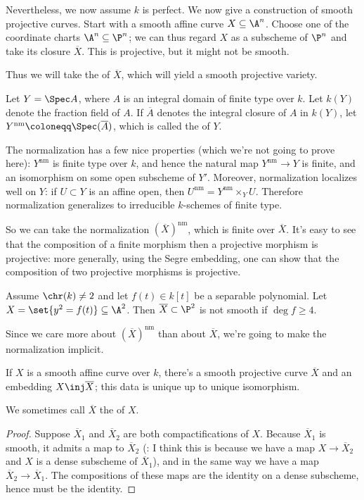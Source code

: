 Nevertheless, we now assume $k$ is perfect. We now give a construction of smooth projective curves. Start with a
smooth affine curve $X\subseteq\A^n$. Choose one of the coordinate charts $\A^n\subseteq\P^n$; we can thus regard
$X$ as a subscheme of $\P^n$ and take its closure $\overline X$. This is projective, but it might not be smooth.

Thus we will take the  of $\overline X$, which will yield a smooth projective variety.
\begin{rem}
Let $Y = \Spec A$, where $A$ is an integral domain of finite type over $k$. Let $k(Y)$ denote the fraction field of
$A$. If $\overline A$ denotes the integral closure of $A$ in $k(Y)$, let $Y^{\mathrm{nm}}\coloneqq\Spec(\overline
A)$, which is called the  of $Y$.

The normalization has a few nice properties (which we're not going to prove here): $Y^{\mathrm{nm}}$ is finite type
over $k$, and hence the natural map $Y^{\mathrm{nm}}\to Y$ is finite, and an isomorphism on some open subscheme of
$Y'$. Moreover, normalization localizes well on $Y$: if $U\subset Y$ is an affine open, then $U^{\mathrm{nm}} =
Y^{\mathrm{nm}}\times_Y U$. Therefore normalization generalizes to irreducible $k$-schemes of finite type.
\end{rem}
So we can take the normalization $(\overline X)^{\mathrm{nm}}$, which is finite over $\overline X$. It's easy to
see that the composition of a finite morphism then a projective morphism is projective: more generally, using the
Segre embedding, one can show that the composition of two projective morphisms is projective.
\begin{exm}
Assume $\chr(k)\ne 2$ and let $f(t)\in k[t]$ be a separable polynomial. Let $X = \set{y^2 = f(t)}\subseteq\A^2$.
Then $\overline X\subset\P^2$ is not smooth if $\deg f\ge 4$.
\end{exm}
Since we care more about $(\overline X)^{\mathrm{nm}}$ than about $\overline X$, we're going to make the
normalization implicit.
\begin{cor}
If $X$ is a smooth affine curve over $k$, there's a smooth projective curve $\overline X$ and an embedding
$X\inj\overline X$; this data is unique up to unique isomorphism.
\end{cor}
We sometimes call $\overline X$ the  of $X$.
\begin{proof}
Suppose $\overline X_1$ and $\overline X_2$ are both compactifications of $X$. Because $\overline X_1$ is smooth,
it admits a map to $\overline X_2$ (\TODO: I think this is because we have a map $X\to\overline X_2$ and $X$ is a
dense subscheme of $\overline X_1$), and in the same way we have a map $\overline X_2\to\overline X_1$. The
compositions of these maps are the identity on a dense subscheme, hence must be the identity.
\end{proof}
